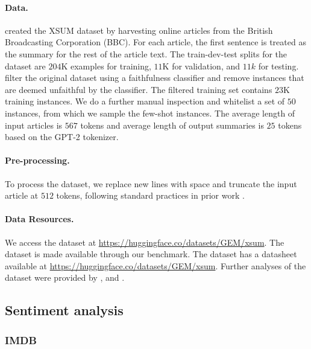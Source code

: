 \paragraph{Data.}
\citet{narayan-etal-2018-dont} created the XSUM dataset by harvesting online articles from the British Broadcasting Corporation (BBC). For each article, the first sentence is treated as the summary for the rest of the article text. 
The train-dev-test splits for the dataset are $204$K examples for training, $11$K for validation, and $11k$ for testing. \citet{gehrmann2021gem} filter the original dataset using a faithfulness classifier and remove instances that are deemed unfaithful by the classifier. The filtered training set contains $23$K training instances. We do a further manual inspection and whitelist a set of $50$ instances, from which we sample the few-shot instances.
The average length of input articles is $567$ tokens and average length of output summaries is $25$ tokens based on the GPT-2 tokenizer.

\paragraph{Pre-processing.}
To process the dataset, we replace new lines with space and truncate the input article at $512$ tokens, following standard practices in prior work \citep{zhang2020pegasus}.

\paragraph{Data Resources.}
We access the dataset at \url{https://huggingface.co/datasets/GEM/xsum}.
The dataset is made available through our benchmark.
The dataset has a datasheet available at \url{https://huggingface.co/datasets/GEM/xsum}.
Further analyses of the dataset were provided by \citet{jung2019earlier}, \citet{bommasani2020intrinsic} and \citet{tejaswin2021summarization}. 

\subsection{Sentiment analysis}
\label{app:scenarios-sentiment}
\subsubsection{IMDB}
